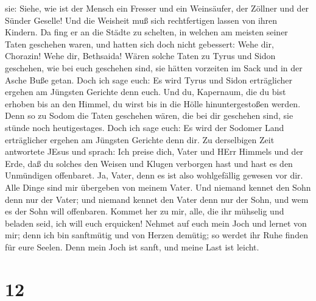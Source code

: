 sie: Siehe, wie ist der Mensch ein Fresser und ein Weinsäufer, der
Zöllner und der Sünder Geselle! Und die Weisheit muß sich rechtfertigen
lassen von ihren Kindern.  Da fing er an die Städte zu
schelten, in welchen am meisten seiner Taten geschehen waren, und hatten
sich doch nicht gebessert:  Wehe dir, Chorazin! Wehe dir,
Bethsaida! Wären solche Taten zu Tyrus und Sidon geschehen, wie bei euch
geschehen sind, sie hätten vorzeiten im Sack und in der Asche Buße
getan.  Doch ich sage euch: Es wird Tyrus und Sidon
erträglicher ergehen am Jüngsten Gerichte denn euch.  Und
du, Kapernaum, die du bist erhoben bis an den Himmel, du wirst bis in
die Hölle hinuntergestoßen werden. Denn so zu Sodom die Taten geschehen
wären, die bei dir geschehen sind, sie stünde noch heutigestages.
 Doch ich sage euch: Es wird der Sodomer Land erträglicher
ergehen am Jüngsten Gerichte denn dir.  Zu derselbigen Zeit
antwortete JEsus und sprach: Ich preise dich, Vater und HErr Himmels und
der Erde, daß du solches den Weisen und Klugen verborgen hast und hast
es den Unmündigen offenbaret.  Ja, Vater, denn es ist also
wohlgefällig gewesen vor dir.  Alle Dinge sind mir
übergeben von meinem Vater. Und niemand kennet den Sohn denn nur der
Vater; und niemand kennet den Vater denn nur der Sohn, und wem es der
Sohn will offenbaren.  Kommet her zu mir, alle, die ihr
mühselig und beladen seid, ich will euch erquicken!  Nehmet
auf euch mein Joch und lernet von mir; denn ich bin sanftmütig und von
Herzen demütig; so werdet ihr Ruhe finden für eure Seelen. 
Denn mein Joch ist sanft, und meine Last ist leicht.

\hypertarget{section-11}{%
\section{12}\label{section-11}}

